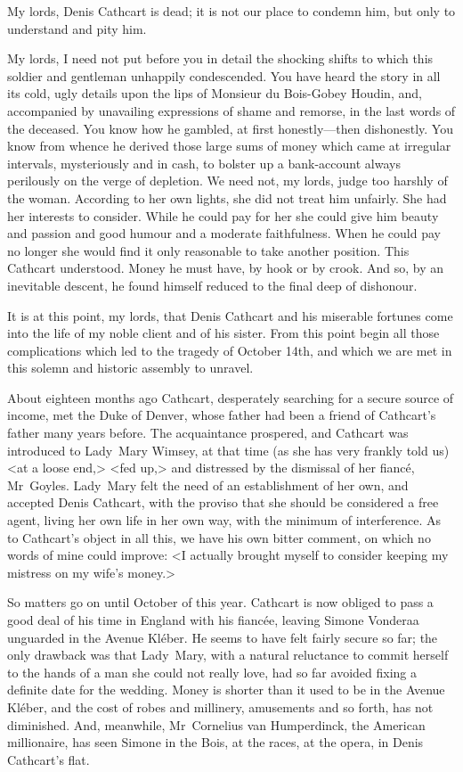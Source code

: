 \begin{dialogue}
My lords, Denis Cathcart is dead; it is not our place to condemn him, but only to understand and pity him.

My lords, I need not put before you in detail the shocking shifts to which this soldier and gentleman unhappily condescended. You have heard the story in all its cold, ugly details upon the lips of Monsieur du Bois-Gobey Houdin, and, accompanied by unavailing expressions of shame and remorse, in the last words of the deceased. You know how he gambled, at first honestly—then dishonestly. You know from whence he derived those large sums of money which came at irregular intervals, mysteriously and in cash, to bolster up a bank-account always perilously on the verge of depletion. We need not, my lords, judge too harshly of the woman. According to her own lights, she did not treat him unfairly. She had her interests to consider. While he could pay for her she could give him beauty and passion and good humour and a moderate faithfulness. When he could pay no longer she would find it only reasonable to take another position. This Cathcart understood. Money he must have, by hook or by crook. And so, by an inevitable descent, he found himself reduced to the final deep of dishonour.

It is at this point, my lords, that Denis Cathcart and his miserable fortunes come into the life of my noble client and of his sister. From this point begin all those complications which led to the tragedy of October 14th, and which we are met in this solemn and historic assembly to unravel.

About eighteen months ago Cathcart, desperately searching for a secure source of income, met the Duke of Denver, whose father had been a friend of Cathcart's father many years before. The acquaintance prospered, and Cathcart was introduced to Lady~Mary Wimsey, at that time (as she has very frankly told us) <at a loose end,> <fed up,> and distressed by the dismissal of her fiancé, Mr~Goyles. Lady~Mary felt the need of an establishment of her own, and accepted Denis Cathcart, with the proviso that she should be considered a free agent, living her own life in her own way, with the minimum of interference. As to Cathcart's object in all this, we have his own bitter comment, on which no words of mine could improve: <I actually brought myself to consider keeping my mistress on my wife's money.>

So matters go on until October of this year. Cathcart is now obliged to pass a good deal of his time in England with his fiancée, leaving Simone Vonderaa unguarded in the Avenue Kléber. He seems to have felt fairly secure so far; the only drawback was that Lady~Mary, with a natural reluctance to commit herself to the hands of a man she could not really love, had so far avoided fixing a definite date for the wedding. Money is shorter than it used to be in the Avenue Kléber, and the cost of robes and millinery, amusements and so forth, has not diminished. And, meanwhile, Mr~Cornelius van Humperdinck, the American millionaire, has seen Simone in the Bois, at the races, at the opera, in Denis Cathcart's flat.


\end{dialogue}
